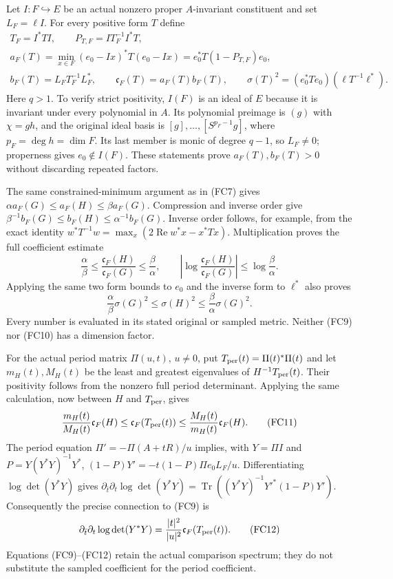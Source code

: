 \documentclass{article}
\begin{document}
Let $I:F\hookrightarrow E$ be an actual nonzero proper $A$-invariant
constituent and set $L_F=\ell I$. For every positive form $T$ define
\[
\begin{gathered}
 T_F=I^*TI,\qquad P_{T,F}=I T_F^{-1}I^*T,\\
 a_F(T)=\min_{x\in F}(e_0-Ix)^*T(e_0-Ix)
       =e_0^*T(1-P_{T,F})e_0,\\
 b_F(T)=L_F T_F^{-1}L_F^*,\qquad
 \mathfrak c_F(T)=a_F(T)b_F(T),\qquad
 \sigma(T)^2=(e_0^*Te_0)(\ell T^{-1}\ell^*).
\end{gathered}\tag{FC8}
\]
Here $q>1$. To verify strict positivity, $I(F)$ is an ideal of $E$
because it is invariant under every polynomial in $A$. Its polynomial
preimage is $(g)$ with $\chi=gh$, and the original ideal basis is
$[g],\ldots,[S^{p_F-1}g]$, where $p_F=\deg h=\dim F$.
Its last member is monic of degree $q-1$, so $L_F\ne0$; properness gives
$e_0\notin I(F)$. These statements prove $a_F(T),b_F(T)>0$ without
discarding repeated factors.

The same constrained-minimum argument as in (FC7) gives
$\alpha a_F(G)\le a_F(H)\le\beta a_F(G)$.
Compression and inverse order give
$\beta^{-1}b_F(G)\le b_F(H)\le\alpha^{-1}b_F(G)$.
Inverse order follows, for example, from the exact identity
$w^*T^{-1}w=\max_x(2\operatorname{Re}w^*x-x^*Tx)$.
Multiplication proves the full coefficient estimate
\[
 \boxed{\frac{\alpha}{\beta}\le
       \frac{\mathfrak c_F(H)}{\mathfrak c_F(G)}
           \le\frac{\beta}{\alpha},\qquad
 \left|\log\frac{\mathfrak c_F(H)}{\mathfrak c_F(G)}\right|
           \le\log\frac{\beta}{\alpha}.}
 \tag{FC9}
\]
Applying the same two form bounds to $e_0$ and the inverse form to
$\ell^*$ also proves
\[
 \frac{\alpha}{\beta}\sigma(G)^2\le\sigma(H)^2
       \le\frac{\beta}{\alpha}\sigma(G)^2.
 \tag{FC10}
\]
Every number is evaluated in its stated original or sampled metric.
Neither (FC9) nor (FC10) has a dimension factor.

For the actual period matrix $\Pi(u,t)$, $u\ne0$, put
$T_{\rm per}(t)=\Pi(t)^*\Pi(t)$ and let $m_H(t),M_H(t)$ be the least
and greatest eigenvalues of $H^{-1}T_{\rm per}(t)$. Their positivity
follows from the nonzero full period determinant. Applying the same
calculation, now between $H$ and $T_{\rm per}$, gives
\[
 \frac{m_H(t)}{M_H(t)}\mathfrak c_F(H)
 \le\mathfrak c_F(T_{\rm per}(t))
 \le\frac{M_H(t)}{m_H(t)}\mathfrak c_F(H).
 \tag{FC11}
\]
The period equation $\Pi'=-\Pi(A+tR)/u$ implies, with $Y=\Pi I$ and
$P=Y(Y^*Y)^{-1}Y^*$,
$(1-P)Y'=-t(1-P)\Pi e_0L_F/u$. Differentiating
$\log\det(Y^*Y)$ gives
$\partial_{\bar t}\partial_t\log\det(Y^*Y)
=\operatorname{Tr}((Y^*Y)^{-1}Y'^*(1-P)Y')$.
Consequently the precise connection to (FC9) is
\[
 \partial_{\bar t}\partial_t\log\det(Y^*Y)
       =\frac{|t|^2}{|u|^2}\mathfrak c_F(T_{\rm per}(t)).
 \tag{FC12}
\]
Equations (FC9)--(FC12) retain the actual comparison spectrum; they do
not substitute the sampled coefficient for the period coefficient.
\end{document}
